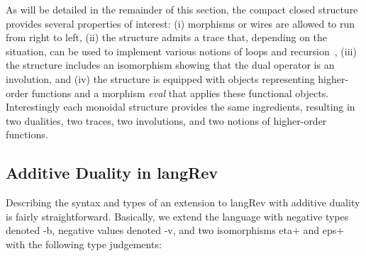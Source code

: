 \documentclass[preprint]{sigplanconf}
\begin{document}
As will be detailed in the remainder of this section, the compact closed
structure provides several properties of interest: (i) morphisms or wires are
allowed to run from right to left, (ii) the structure admits a trace that,
depending on the situation, can be used to implement various notions of loops
and
recursion~\cite{joyal1996traced,Hasegawa:2009:TMC:1552068.1552069,Hasegawa:1997:RCS:645893.671607},
(iii) the structure includes an isomorphism showing that the dual operator is
an involution, and (iv) the structure is equipped with objects representing
higher-order functions and a morphism \textit{eval} that applies these
functional objects. Interestingly each monoidal structure provides the same
ingredients, resulting in two dualities, two traces, two involutions, and two
notions of higher-order functions.

\subsection{Additive Duality in {{langRev}} }
\label{sec:neg}

Describing the syntax and types of an extension to {{langRev}} with additive
duality is fairly straightforward. Basically, we extend the language with
negative types denoted {{-b}}, negative values denoted {{-v}}, and two
isomorphisms {{eta+}} and {{eps+}} with the following type judgements:

%

\vspace{-15pt}
\begin{multicols}{2}  

\end{multicols}
\end{document}
